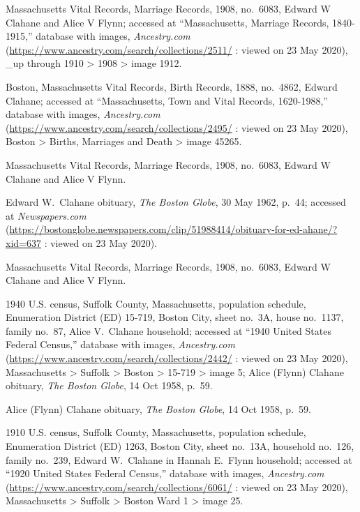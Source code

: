 \begin{thebibliography}{999}
Massachusetts Vital Records, Marriage Records, 1908, no.\ 6083, Edward W Clahane and Alice V Flynn; accessed at ``Massachusetts, Marriage Records, 1840-1915,'' database with images, \textit{Ancestry.com} (\url{https://www.ancestry.com/search/collections/2511/} : viewed on 23 May 2020), \_up through 1910 > 1908 > image 1912.

Boston, Massachusetts Vital Records, Birth Records, 1888, no.\ 4862, Edward Clahane; accessed at ``Massachusetts, Town and Vital Records, 1620-1988,'' database with images, \textit{Ancestry.com} (\url{https://www.ancestry.com/search/collections/2495/} : viewed on 23 May 2020), Boston > Births, Marriages and Death > image 45265.

Massachusetts Vital Records, Marriage Records, 1908, no.\ 6083, Edward W Clahane and Alice V Flynn.

Edward W.\ Clahane obituary, \textit{The Boston Globe}, 30 May 1962, p.\ 44; accessed at \textit{Newspapers.com} (\url{https://bostonglobe.newspapers.com/clip/51988414/obituary-for-ed-ahane/?xid=637} : viewed on 23 May 2020).

Massachusetts Vital Records, Marriage Records, 1908, no.\ 6083, Edward W Clahane and Alice V Flynn.

1940 U.S. census, Suffolk County, Massachusetts, population schedule, Enumeration District (ED) 15-719, Boston City, sheet no.\ 3A, house no.\ 1137, family no.\ 87, Alice V.\ Clahane household; accessed at ``1940 United States Federal Census,'' database with images, \textit{Ancestry.com} (\url{https://www.ancestry.com/search/collections/2442/} : viewed on 23 May 2020), Massachusetts > Suffolk > Boston > 15-719 > image 5; Alice (Flynn) Clahane obituary, \textit{The Boston Globe}, 14 Oct 1958, p.\ 59.

Alice (Flynn) Clahane obituary, \textit{The Boston Globe}, 14 Oct 1958, p.\ 59.

1910 U.S. census, Suffolk County, Massachusetts, population schedule, Enumeration District (ED) 1263, Boston City, sheet no.\ 13A, household no.\ 126, family no.\ 239, Edward W.\ Clahane in Hannah E.\ Flynn household; accessed at ``1920 United States Federal Census,'' database with images, \textit{Ancestry.com} (\url{https://www.ancestry.com/search/collections/6061/} : viewed on 23 May 2020), Massachusetts > Suffolk > Boston Ward 1 > image 25.


\end{thebibliography}
